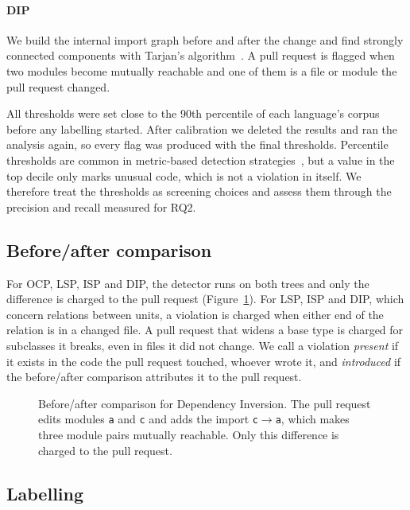 \documentclass[sigconf]{acmart}
\begin{document}
\paragraph{DIP} We build the internal import graph before and after the change and find strongly
connected components with Tarjan's algorithm~\cite{tarjan1972scc}. A pull request is flagged when two
modules become mutually reachable and one of them is a file or module the pull request changed.

All thresholds were set close to the 90th percentile of each language's corpus before any labelling
started. After calibration we deleted the results and ran the analysis again, so every flag was
produced with the final thresholds. Percentile thresholds are common in metric-based detection
strategies~\cite{marinescu2004detection}, but a value in the top decile only marks unusual code,
which is not a violation in itself. We therefore treat the thresholds as screening choices and
assess them through the precision and recall measured for RQ2.

\subsection{Before/after comparison}
\label{sec:delta}

For OCP, LSP, ISP and DIP, the detector runs on both trees and only the difference is charged to the
pull request (Figure~\ref{fig:delta}). For LSP, ISP and DIP, which concern relations between units,
a violation is charged when either end of the relation is in a changed file. A pull request that
widens a base type is charged for subclasses it breaks, even in files it did not change.
We call a violation \emph{present} if it exists in the code the pull request touched, whoever wrote
it, and \emph{introduced} if the before/after comparison attributes it to the pull request.

\begin{figure}[t]
\centering

\caption{Before/after comparison for Dependency Inversion. The pull request edits modules \texttt{a}
and \texttt{c} and adds the import \texttt{c}$\rightarrow$\texttt{a}, which makes three module pairs
mutually reachable. Only this difference is charged to the pull request.}
\label{fig:delta}
\end{figure}

\subsection{Labelling}
\label{sec:judge}
\end{document}
